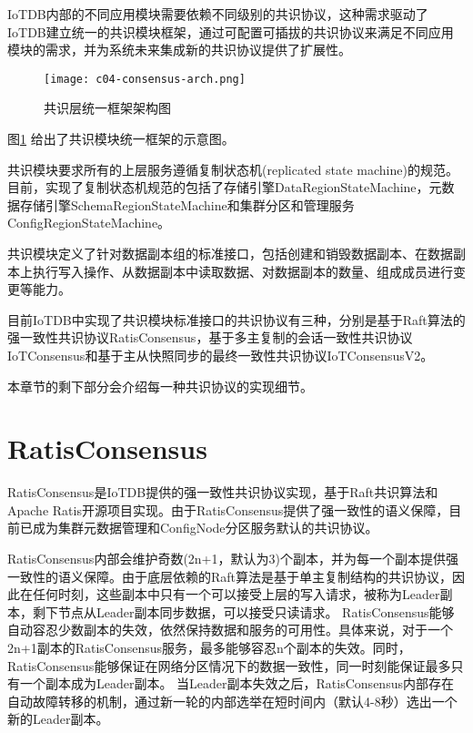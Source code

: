 IoTDB内部的不同应用模块需要依赖不同级别的共识协议，这种需求驱动了IoTDB建立统一的共识模块框架，通过可配置可插拔的共识协议来满足不同应用模块的需求，并为系统未来集成新的共识协议提供了扩展性。

\begin{figure}
    \centering
    \texttt{[image: c04-consensus-arch.png]}
    \caption{共识层统一框架架构图}
    \label{fig:c04-consensus-arch}
  \end{figure}
  
图\ref{fig:c04-consensus-arch} 给出了共识模块统一框架的示意图。

共识模块要求所有的上层服务遵循复制状态机(replicated state machine)\cite{lamport1978statemachine}的规范。目前，实现了复制状态机规范的包括了存储引擎DataRegionStateMachine，元数据存储引擎SchemaRegionStateMachine和集群分区和管理服务ConfigRegionStateMachine。

共识模块定义了针对数据副本组的标准接口，包括创建和销毁数据副本、在数据副本上执行写入操作、从数据副本中读取数据、对数据副本的数量、组成成员进行变更等能力。

目前IoTDB中实现了共识模块标准接口的共识协议有三种，分别是基于Raft算法的强一致性共识协议RatisConsensus，基于多主复制的会话一致性共识协议IoTConsensus和基于主从快照同步的最终一致性共识协议IoTConsensusV2。

本章节的剩下部分会介绍每一种共识协议的实现细节。


\section{RatisConsensus}

RatisConsensus是IoTDB提供的强一致性共识协议实现，基于Raft共识算法和Apache Ratis\cite{ratis}开源项目实现。由于RatisConsensus提供了强一致性的语义保障，目前已成为集群元数据管理和ConfigNode分区服务默认的共识协议。

RatisConsensus内部会维护奇数(2n+1，默认为3)个副本，并为每一个副本提供强一致性的语义保障。由于底层依赖的Raft算法是基于单主复制结构的共识协议，因此在任何时刻，这些副本中只有一个可以接受上层的写入请求，被称为Leader副本，剩下节点从Leader副本同步数据，可以接受只读请求。
RatisConsensus能够自动容忍少数副本的失效，依然保持数据和服务的可用性。具体来说，对于一个2n+1副本的RatisConsensus服务，最多能够容忍n个副本的失效。同时，RatisConsensus能够保证在网络分区情况下的数据一致性，同一时刻能保证最多只有一个副本成为Leader副本。
当Leader副本失效之后，RatisConsensus内部存在自动故障转移的机制，通过新一轮的内部选举在短时间内（默认4-8秒）选出一个新的Leader副本。

